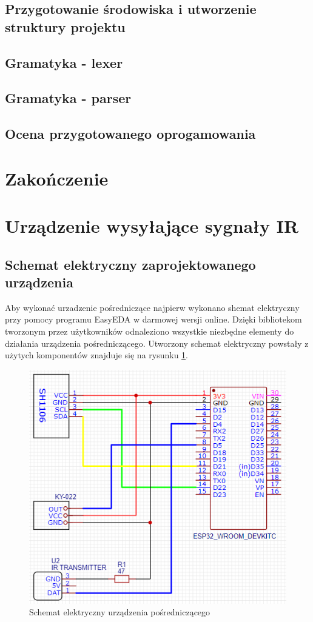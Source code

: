 \documentclass[12pt,twoside]{article}
\begin{document}
\subsection{Przygotowanie środowiska i utworzenie struktury projektu}
\subsection{Gramatyka - lexer}
\subsection{Gramatyka - parser}
\subsection{Ocena przygotowanego oprogamowania}
\clearpage
\section{Zakończenie}
\clearpage
\section{Urządzenie wysyłające sygnały IR}
\subsection{Schemat elektryczny zaprojektowanego urządzenia}
Aby wykonać urzadzenie pośredniczące najpierw wykonano shemat elektryczny przy pomocy programu EasyEDA w darmowej wersji online\cite{easyEda}. Dzięki bibliotekom tworzonym przez użytkowników odnaleziono wszystkie niezbędne elementy do działania urządzenia pośredniczącego. Utworzony schemat elektryczny powstały z użytych komponentów znajduje się na rysunku \ref*{Fig:deviceScheme}.
\begin{figure}[ht]
   \centering
   \includegraphics[width=12cm]{images/deviceScheme.png}
   \caption{Schemat elektryczny urządzenia pośredniczącego}
   \label{Fig:deviceScheme}
\end{figure}
\end{document}
